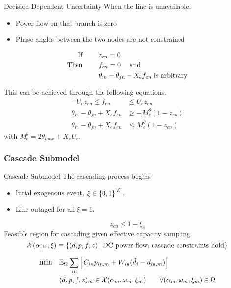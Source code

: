 \begin{frame}{Decision Dependent Uncertainty}
When the line is unavailable, 
\begin{itemize}
\item Power flow on that branch is zero 
\item Phase angles between the two nodes are not constrained
\end{itemize}
\begin{align*}
\mbox{If }
		\hspace{20px}&z_{en} = 0	\\
\mbox{Then }
		\hspace{20px}&f_{en} = 0  \hspace{10px} \mbox{ and}\\
				&\theta_{in} - \theta_{jn} - X_{e}f_{en} \mbox{ is arbitrary}
\end{align*}	

\pause
This can be achieved through the following equations.
\begin{align*}
-U_{e} z_{en} \le f_{en} &\le U_{e} z_{en}	\\
\theta_{in} - \theta_{jn} + X_e f_{en} &\ge -M^\theta_e(1-z_{en}) \\
\theta_{in} - \theta_{jn} + X_e f_{en} &\le M^\theta_e(1-z_{en})  
\end{align*}
with $M^\theta_e = 2 \theta_{max} + X_e U_e$.

\end{frame}


\subsubsection{Cascade Submodel}

\begin{frame}{Cascade Submodel}
The cascading process begins
\begin{itemize}
\item Intial exogenous event, $\xi \in \left\{ 0, 1 \right\}^{\left| \mathcal{E} \right|}$.  
\item Line outaged for all $\xi = 1$.
\end{itemize}
\begin{equation*}
z_{en} \le 1- \xi_e  
\end{equation*}
\pause
Feasible region for cascading given effective capacity sampling
\begin{equation*}
{\cal X} (\alpha, \omega, \xi) \equiv \left\{ \left(d, p, f, z \right)  |  \mbox{ DC power flow, cascade constraints  hold} \right\} 
\end{equation*}

\pause
{}
\begin{align*} \displaystyle
	{\large \mbox{min}} \hspace{10px} &  \Expect_\Omega \sum_{in} \left[ C_{in}  p_{in,m}  + W_{in} (\hat{d}_{i} - d_{in,m}) \right]	\\
	&(d,p,f,z)_m  \in \cX (\alpha_m, \omega_m, \xi_m)    \hspace{20px}   \forall (\alpha_m,\omega_m,\xi_m) \in \Omega
\end{align*}
\EBR
\end{frame}


